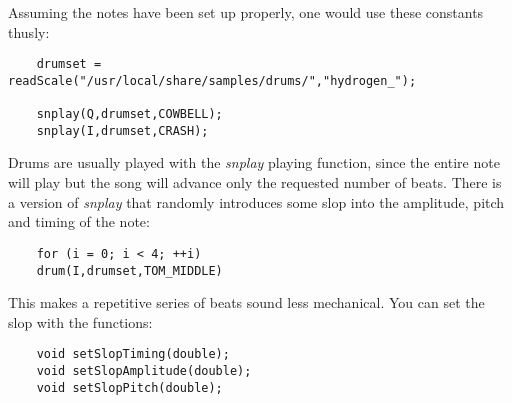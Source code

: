 \documentclass{article}
\begin{document}
Assuming the notes have been set up properly, one would
use these constants thusly:

\begin{verbatim}
    drumset = readScale("/usr/local/share/samples/drums/","hydrogen_");

    snplay(Q,drumset,COWBELL);
    snplay(I,drumset,CRASH);
\end{verbatim}

Drums are usually played with the {\it snplay} playing function, since
the entire note will play but the song will advance only the
requested number of beats. There is a version of {\it snplay} that
randomly introduces some slop into the amplitude, pitch and
timing of the note:

\begin{verbatim}
    for (i = 0; i < 4; ++i)
	drum(I,drumset,TOM_MIDDLE)
\end{verbatim}

This makes a repetitive series of beats sound less mechanical.
You can set the slop with the functions:

\begin{verbatim}
    void setSlopTiming(double);
    void setSlopAmplitude(double);
    void setSlopPitch(double);
\end{verbatim}
\end{document}
